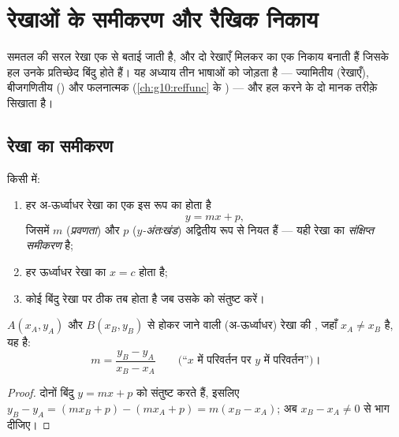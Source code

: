 \chapter{रेखाओं के समीकरण और रैखिक निकाय}\label{ch:g10:lines}

 समतल की सरल रेखा एक  से बताई जाती है, और दो रेखाएँ मिलकर
 का एक निकाय बनाती हैं जिसके हल उनके प्रतिच्छेद बिंदु होते हैं। यह
अध्याय तीन भाषाओं को जोड़ता है --- ज्यामितीय (रेखाएँ), बीजगणितीय ()
और फलनात्मक (\cref{ch:g10:reffunc} के ) --- और  हल करने के दो मानक तरीक़े
सिखाता है।

\section{रेखा का समीकरण}

\begin{theorem}[संक्षिप्त समीकरण]\label{thm:g10:lines:reduced}
किसी  में:
\begin{enumerate}
  \item हर अ-ऊर्ध्वाधर रेखा का एक  इस रूप का होता है
        \[
        y = mx + p ,
        \]
        जिसमें $m$ (\emph{प्रवणता}) और $p$
        (\emph{$y$-अंतःखंड}) अद्वितीय रूप से नियत हैं --- यही रेखा का
        \emph{संक्षिप्त समीकरण} है;
  \item हर ऊर्ध्वाधर रेखा का  $x = c$ होता है;
  \item कोई बिंदु रेखा पर ठीक तब होता है जब उसके   को
        संतुष्ट करें।
\end{enumerate}
\end{theorem}
\admitted

\begin{proposition}[दो बिंदुओं से प्रवणता]\label{prop:g10:lines:slope}
$A(x_A, y_A)$ और $B(x_B, y_B)$ से होकर जाने वाली (अ-ऊर्ध्वाधर) रेखा की , जहाँ $x_A \neq x_B$ है,
यह है:
\[
m = \frac{y_B - y_A}{x_B - x_A}
\qquad
\text{(``$x$ में परिवर्तन पर $y$ में परिवर्तन'')।}
\]
\end{proposition}

\begin{proof}
दोनों बिंदु $y = mx + p$ को संतुष्ट करते हैं, इसलिए $y_B - y_A = (mx_B + p) - (mx_A + p)
= m(x_B - x_A)$; अब $x_B - x_A \neq 0$ से भाग दीजिए।
\end{proof}

